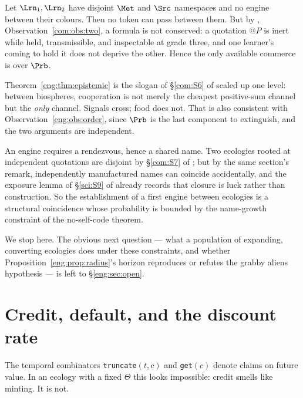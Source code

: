 \begin{theorem}
\label{eng:thm:epistemic}
Let $\Lrn_1, \Lrn_2$ have disjoint $\Met$ and $\Src$ namespaces and no
engine between their colours. Then no token can pass between them. But by
\chComp, Observation~\ref{com:obs:two}, a formula is not conserved: a quotation $@P$
is inert while held, transmissible, and inspectable at grade three, and one
learner's coming to hold it does not deprive the other. Hence the only
available commerce is over $\Prb$.
\end{theorem}

Theorem~\ref{eng:thm:epistemic} is the slogan of \S\ref{com:S6} of \chComp scaled up
one level: between biospheres, cooperation is not merely the cheapest
positive-sum channel but the \emph{only} channel. Signals cross; food does
not. That is also consistent with Observation~\ref{eng:obs:order}, since $\Prb$
is the last component to extinguish, and the two arguments are
independent.

\begin{proposition}\label{eng:first-contact-coincidence-construction}
An engine requires a rendezvous, hence a shared name. Two ecologies rooted
at independent quotations are disjoint by
\S\ref{com:S7} of \chComp; but by the same section's remark, independently
manufactured names can coincide accidentally, and the exposure lemma of
\S\ref{sci:S9} of \chSci already records that closure is luck rather than
construction. So the establishment of a first engine between ecologies is a
structural coincidence whose probability is bounded by the name-growth
constraint of the no-self-code theorem.
\end{proposition}

We stop here. The obvious next question --- what a population of expanding,
converting ecologies does under these constraints, and whether
Proposition~\ref{eng:prop:radius}'s horizon reproduces or refutes the grabby
aliens hypothesis \cite{hanson} --- is left to \S\ref{eng:sec:open}.

\section{Credit, default, and the discount rate}\label{eng:S11}
\label{eng:sec:credit}

The temporal combinators \texttt{truncate}$(t,c)$ and \texttt{get}$(c)$
denote claims on future value. In an ecology with a fixed $\Theta$ this
looks impossible: credit smells like minting. It is not.

